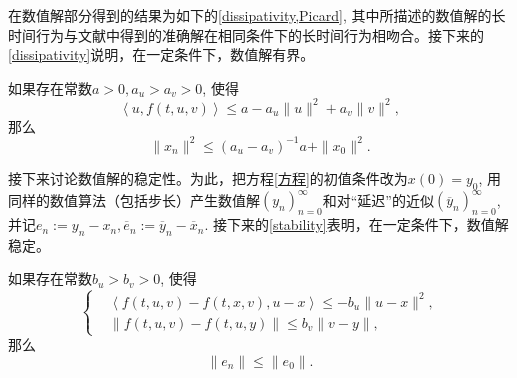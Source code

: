 在数值解部分得到的结果为如下的\cref{dissipativity,Picard}, 其中所描述的数值解的长时间行为与文献中得到的准确解在相同条件下的长时间行为相吻合。接下来的\cref{dissipativity}说明，在一定条件下，数值解有界。
\begin{theorem}\label{dissipativity}
    如果存在常数$a>0,a_u>a_v>0$, 使得
    \begin{equation*}
        \left<u,f(t,u,v)\right>\leqslant a-a_u \|u\|^2+a_v \|v\|^2,
    \end{equation*}
    那么
    \begin{equation}\label{耗散性结果}
        \|x_n\|^2\leqslant \left(a_u-a_v\right)^{-1}a+\|x_0\|^2.
    \end{equation}
\end{theorem}
接下来讨论数值解的稳定性。为此，把方程\eqref{方程}的初值条件改为$x(0)=y_0$, 用同样的数值算法（包括步长）产生数值解$\left(y_n\right)_{n=0}^\infty$和对“延迟”的近似$\left(\overline y_n\right)_{n=0}^\infty$, 并记$e_n:=y_n-x_n, \overline e_n:=\overline y_n-\overline x_n$. 接下来的\cref{stability}表明，在一定条件下，数值解稳定。
\begin{theorem}\label{stability}
    如果存在常数$b_u>b_v>0$, 使得
    \begin{equation*}
        \left\{
            \begin{aligned}
                &\left<f(t,u,v)-f(t,x,v),u-x\right>\leqslant -b_u \|u-x\|^2,
                \\ &\|f(t,u,v)-f(t,u,y)\|\leqslant b_v \|v-y\|,
            \end{aligned}
        \right.
    \end{equation*}
    那么
    \begin{equation*}
        \|e_n\|\leqslant \|e_0\|.
    \end{equation*}
\end{theorem}